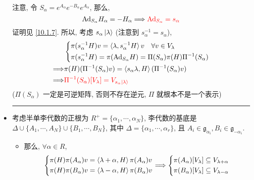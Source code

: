 \begin{itemize}
	\begin{tcolorbox}[title=proof:]
		注意, 令 $S_\alpha = e^{A_\alpha} e^{- B_\alpha} e^{A_\alpha}$, 那么,
		\begin{equation}
			\mathrm{Ad}_{S_\alpha} H_\alpha = - H_\alpha \Longrightarrow \mathcolor{red}{\mathrm{Ad}_{S_\alpha} = s_\alpha}
		\end{equation}
		证明见 \eqref{10.1.7}. 所以, 考虑 $s_\alpha \ket{\lambda}$ (注意到 $s_\alpha^{- 1} = s_\alpha$),
		\begin{align}
			& \begin{dcases}
				\pi(s_\alpha^{- 1} H) v = \braket{\lambda, s_\alpha^{- 1} H} v \quad \forall v \in V_\lambda \\
				\pi(s_\alpha^{- 1} H) = \pi(\mathrm{Ad}_{S_\alpha} H) = \Pi(S_\alpha) \pi(H) \Pi^{- 1}(S_\alpha)
			\end{dcases} \notag \\
			\Longrightarrow & \pi(H) (\Pi^{- 1}(S_\alpha) v) = \braket{s_\alpha \lambda, H} (\Pi^{- 1}(S_\alpha) v) \notag \\
			\Longrightarrow & \mathcolor{red}{\Pi^{- 1}(S_\alpha)[V_\lambda] = V_{s_\alpha \ket{\lambda}}} \label{8.1.4}
		\end{align}
		($\Pi(S_\alpha)$ 一定是可逆矩阵, 否则不存在逆元, $\Pi$ 就根本不是一个表示)
	\end{tcolorbox}
	
	\noindent\rule[0.5ex]{\linewidth}{0.5pt} %
	
	\item 考虑半单李代数的正根为 $R^+ = \{\alpha_1, \cdots, \alpha_N\}$, 李代数的基底是 $\Delta \cup \{A_1, \cdots, A_N\} \cup \{B_1, \cdots, B_N\}$, 其中 $\Delta = \{\alpha_1, \cdots, \alpha_r\}$, 且 $A_i \in \mathfrak{g}_{\alpha_i}, B_i \in \mathfrak{g}_{- \alpha_i}$.
	\begin{itemize}
		\item 那么, $\forall \alpha \in R$,
		\begin{equation} \label{8.1.5}
			\begin{dcases}
				\pi(H) \pi(A_\alpha) v = \braket{\lambda + \alpha, H} \pi(A_\alpha) v \\
				\pi(H) \pi(B_\alpha) v = \braket{\lambda - \alpha, H} \pi(B_\alpha) v
			\end{dcases} \Longrightarrow \begin{dcases}
				\pi(A_\alpha)[V_\lambda] \subseteq V_{\lambda + \alpha} \\
				\pi(B_\alpha)[V_\lambda] \subseteq V_{\lambda - \alpha}
			\end{dcases}
		\end{equation}
		

\end{itemize}
\end{itemize}
